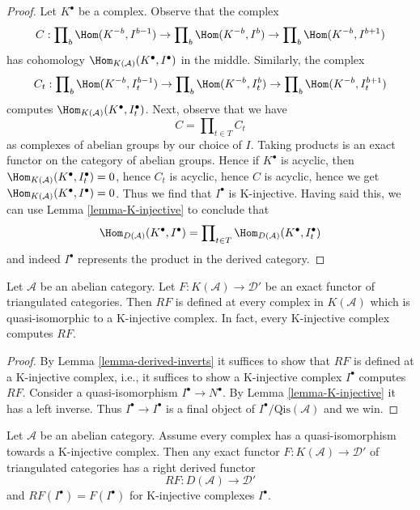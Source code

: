 \begin{proof}
Let $K^\bullet$ be a complex. Observe that the complex
$$
C :
\prod\nolimits_b \Hom(K^{-b}, I^{b - 1}) \to
\prod\nolimits_b \Hom(K^{-b}, I^b) \to
\prod\nolimits_b \Hom(K^{-b}, I^{b + 1})
$$
has cohomology $\Hom_{K(\mathcal{A})}(K^\bullet, I^\bullet)$
in the middle. Similarly, the complex
$$
C_t :
\prod\nolimits_b \Hom(K^{-b}, I_t^{b - 1}) \to
\prod\nolimits_b \Hom(K^{-b}, I_t^b) \to
\prod\nolimits_b \Hom(K^{-b}, I_t^{b + 1})
$$
computes $\Hom_{K(\mathcal{A})}(K^\bullet, I_t^\bullet)$.
Next, observe that we have
$$
C = \prod\nolimits_{t \in T} C_t
$$
as complexes of abelian groups by our choice of $I$.
Taking products is an exact functor on the
category of abelian groups. Hence if $K^\bullet$ is acyclic, then
$\Hom_{K(\mathcal{A})}(K^\bullet, I_t^\bullet) = 0$, hence
$C_t$ is acyclic, hence $C$ is acyclic, hence we get
$\Hom_{K(\mathcal{A})}(K^\bullet, I^\bullet) = 0$.
Thus we find that $I^\bullet$ is K-injective.
Having said this, we can use Lemma \ref{lemma-K-injective}
to conclude that
$$
\Hom_{D(\mathcal{A})}(K^\bullet, I^\bullet)
=
\prod\nolimits_{t \in T} \Hom_{D(\mathcal{A})}(K^\bullet, I_t^\bullet)
$$
and indeed $I^\bullet$ represents the product in the derived category.
\end{proof}

\begin{lemma}
\label{lemma-K-injective-defined}
Let $\mathcal{A}$ be an abelian category.
Let $F : K(\mathcal{A}) \to \mathcal{D}'$ be an exact functor
of triangulated categories. Then $RF$ is defined at every complex
in $K(\mathcal{A})$ which is quasi-isomorphic to a
K-injective complex. In fact, every K-injective complex computes $RF$.
\end{lemma}

\begin{proof}
By
Lemma \ref{lemma-derived-inverts}
it suffices to show that $RF$ is defined at a K-injective complex,
i.e., it suffices to show a K-injective complex $I^\bullet$ computes $RF$.
Consider a quasi-isomorphism $I^\bullet \to N^\bullet$. By
Lemma \ref{lemma-K-injective} it has a left inverse.
Thus $I^\bullet \to I^\bullet$ is a final object of
$I^\bullet/\text{Qis}(\mathcal{A})$ and we win.
\end{proof}

\begin{lemma}
\label{lemma-enough-K-injectives-implies}
Let $\mathcal{A}$ be an abelian category.
Assume every complex has a quasi-isomorphism towards a K-injective complex.
Then any exact functor $F : K(\mathcal{A}) \to \mathcal{D}'$ of triangulated
categories has a right derived functor
$$
RF : D(\mathcal{A}) \longrightarrow \mathcal{D}'
$$
and $RF(I^\bullet) = F(I^\bullet)$ for K-injective complexes $I^\bullet$.
\end{lemma}


